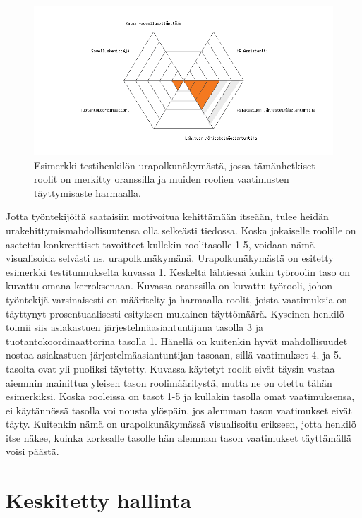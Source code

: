 \documentclass[a4paper,finnish,12pt]{article}
\begin{document}
\begin{figure}[ht]
\centering
\includegraphics[width=1\textwidth]{urapolkuPlot_tst_usr.png}
\caption{Esimerkki testihenkilön urapolkunäkymästä, jossa tämänhetkiset roolit on merkitty oranssilla ja muiden roolien vaatimusten täyttymisaste harmaalla.}
\label{fig:urapolkuspiderweb}
\end{figure}

Jotta työntekijöitä saataisiin motivoitua kehittämään itseään, tulee heidän urakehittymismahdollisuutensa olla selkeästi tiedossa. Koska jokaiselle roolille on asetettu konkreettiset tavoitteet kullekin roolitasolle 1-5, voidaan nämä visualisoida selvästi ns. urapolkunäkymänä. Urapolkunäkymästä on esitetty esimerkki testitunnukselta kuvassa \ref{fig:urapolkuspiderweb}. Keskeltä lähtiessä kukin työroolin taso on kuvattu omana kerroksenaan. Kuvassa oranssilla on kuvattu työrooli, johon työntekijä varsinaisesti on määritelty ja harmaalla roolit, joista vaatimuksia on täyttynyt prosentuaalisesti esityksen mukainen täyttömäärä.  Kyseinen henkilö toimii siis asiakastuen järjestelmäasiantuntijana tasolla 3 ja tuotantokoordinaattorina tasolla 1. Hänellä on kuitenkin hyvät mahdollisuudet nostaa asiakastuen järjestelmäasiantuntijan tasoaan, sillä vaatimukset 4. ja 5. tasolta ovat yli puoliksi täytetty. Kuvassa käytetyt roolit eivät täysin vastaa aiemmin mainittua yleisen tason roolimääritystä, mutta ne on otettu tähän esimerkiksi. Koska rooleissa on tasot 1-5 ja kullakin tasolla omat vaatimuksensa, ei käytännössä tasolla voi nousta ylöspäin, jos alemman tason vaatimukset eivät täyty. Kuitenkin nämä on urapolkunäkymässä visualisoitu erikseen, jotta henkilö itse näkee, kuinka korkealle tasolle hän alemman tason vaatimukset täyttämällä voisi päästä.

\clearpage

\section{Keskitetty hallinta}
\end{document}
